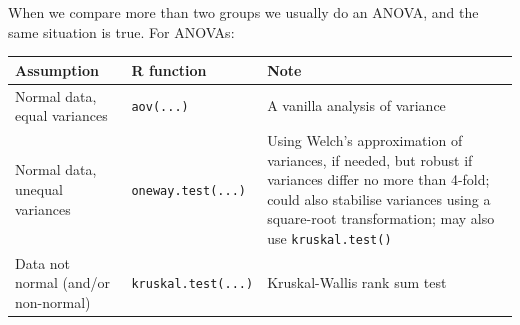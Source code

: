 \documentclass[english,10pt,a4paper,oneside]{book}
\theoremstyle{definition}
\theoremstyle{definition}
\theoremstyle{definition}
\theoremstyle{remark}
\begin{document}
When we compare more than two groups we usually do an ANOVA, and the
same situation is true. For ANOVAs:

\begin{longtable}[]{@{}lll@{}}
\toprule
\begin{minipage}[b]{0.18\columnwidth}\raggedright\strut
Assumption\strut
\end{minipage} & \begin{minipage}[b]{0.27\columnwidth}\raggedright\strut
R function\strut
\end{minipage} & \begin{minipage}[b]{0.46\columnwidth}\raggedright\strut
Note\strut
\end{minipage}\tabularnewline
\midrule
\endhead
\begin{minipage}[t]{0.18\columnwidth}\raggedright\strut
Normal data, equal variances\strut
\end{minipage} & \begin{minipage}[t]{0.27\columnwidth}\raggedright\strut
\texttt{aov(...)}\strut
\end{minipage} & \begin{minipage}[t]{0.46\columnwidth}\raggedright\strut
A vanilla analysis of variance\strut
\end{minipage}\tabularnewline
\begin{minipage}[t]{0.18\columnwidth}\raggedright\strut
Normal data, unequal variances\strut
\end{minipage} & \begin{minipage}[t]{0.27\columnwidth}\raggedright\strut
\texttt{oneway.test(...)}\strut
\end{minipage} & \begin{minipage}[t]{0.46\columnwidth}\raggedright\strut
Using Welch's approximation of variances, if needed, but robust if
variances differ no more than 4-fold; could also stabilise variances
using a square-root transformation; may also use
\texttt{kruskal.test()}\strut
\end{minipage}\tabularnewline
\begin{minipage}[t]{0.18\columnwidth}\raggedright\strut
Data not normal (and/or non-normal)\strut
\end{minipage} & \begin{minipage}[t]{0.27\columnwidth}\raggedright\strut
\texttt{kruskal.test(...)}\strut
\end{minipage} & \begin{minipage}[t]{0.46\columnwidth}\raggedright\strut
Kruskal-Wallis rank sum test\strut
\end{minipage}\tabularnewline
\bottomrule
\end{longtable}
\end{document}
